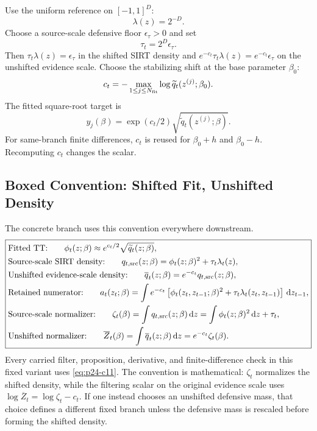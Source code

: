 \documentclass[11pt]{article}
\numberwithin{equation}{section}
\newcommand{\dd}{\,\mathrm d}
\begin{document}
Use the uniform reference on \([-1,1]^D\):
\begin{equation}
    \lambda(z)=2^{-D}.
    \label{eq:p24-c7}
\end{equation}
Choose a source-scale defensive floor \(\epsilon_\tau>0\) and set
\begin{equation}
    \tau_t=2^D\epsilon_\tau.
    \label{eq:p24-c8}
\end{equation}
Then \(\tau_t\lambda(z)=\epsilon_\tau\) in the shifted SIRT density and
\(e^{-c_t}\tau_t\lambda(z)=e^{-c_t}\epsilon_\tau\) on the unshifted evidence
scale.  Choose the stabilizing shift at the base parameter \(\beta_0\):
\begin{equation}
    c_t=-\max_{1\le j\le N_{\rm fit}}
    \log \widetilde q_t(z^{(j)};\beta_0).
    \label{eq:p24-c9}
\end{equation}
The fitted square-root target is
\begin{equation}
    y_j(\beta)=\exp(c_t/2)\sqrt{\widetilde q_t(z^{(j)};\beta)}.
    \label{eq:p24-c10}
\end{equation}
For same-branch finite differences, \(c_t\) is reused for
\(\beta_0+h\) and \(\beta_0-h\).  Recomputing \(c_t\) changes the scalar.

\subsection{Boxed Convention: Shifted Fit, Unshifted Density}

The concrete branch uses this convention everywhere downstream.
\begin{equation}
\boxed{
\begin{aligned}
&\text{Fitted TT:}\qquad
  \phi_t(z;\beta)\approx e^{c_t/2}\sqrt{\widetilde q_t(z;\beta)},\\
&\text{Source-scale SIRT density:}\qquad
  q_{t,{\rm src}}(z;\beta)
  =
  \phi_t(z;\beta)^2+\tau_t\lambda_t(z),\\
&\text{Unshifted evidence-scale density:}\qquad
  \overline q_t(z;\beta)
  =
  e^{-c_t}q_{t,{\rm src}}(z;\beta),\\
&\text{Retained numerator:}\qquad
  a_t(z_t;\beta)
  =
  \int
  e^{-c_t}\left[\phi_t(z_t,z_{t-1};\beta)^2
        +\tau_t\lambda_t(z_t,z_{t-1})\right]\dd z_{t-1},\\
&\text{Source-scale normalizer:}\qquad
  \zeta_t(\beta)
  =
  \int q_{t,{\rm src}}(z;\beta)\dd z
  =
  \int\phi_t(z;\beta)^2\dd z+\tau_t,\\
&\text{Unshifted normalizer:}\qquad
  \overline Z_t(\beta)
  =
  \int \overline q_t(z;\beta)\dd z
  =
  e^{-c_t}\zeta_t(\beta).
\end{aligned}}
\label{eq:p24-c11}
\end{equation}
Every carried filter, proposition, derivative, and finite-difference check in
this fixed variant uses \eqref{eq:p24-c11}.  The convention is mathematical:
\(\zeta_t\) normalizes the shifted density, while the filtering scalar on the
original evidence scale uses
\(\log\overline Z_t=\log\zeta_t-c_t\).  If one instead chooses an unshifted
defensive mass, that choice defines a different fixed branch unless the
defensive mass is rescaled before forming the shifted density.
\end{document}
